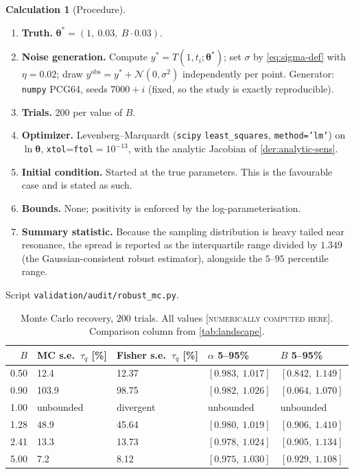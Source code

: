 \documentclass[11pt,a4paper]{article}
\theoremstyle{definition}
\newtheorem{calculationx}{Calculation}[section]
\newcommand{\NUM}{\textcolor{red!55!black}{\footnotesize[\textsc{numerically computed here}]}}
\newcommand{\tq}{\tau_{q}}
\newcommand{\Bnum}{B}
\begin{document}
\begin{calculationx}[Procedure]
\label{calc:mc}
\begin{enumerate}[nosep,label=(\arabic*)]
  \item \textbf{Truth.} $\bm{\theta}^{\ast}=(1,\ 0.03,\ \Bnum\cdot0.03)$.
  \item \textbf{Noise generation.} Compute $y^{\ast}=T(1,t_{i};
        \bm{\theta}^{\ast})$; set $\sigma$ by \eqref{eq:sigma-def} with
        $\eta=0.02$; draw
        $y^{\text{obs}}=y^{\ast}+\mathcal{N}(0,\sigma^{2})$ independently per
        point. Generator: \texttt{numpy} PCG64, seeds $7000+i$ (fixed, so the
        study is exactly reproducible).
  \item \textbf{Trials.} $200$ per value of $\Bnum$.
  \item \textbf{Optimizer.} Levenberg--Marquardt (\texttt{scipy}
        \texttt{least\_squares}, \texttt{method='lm'}) on
        $\ln\bm{\theta}$, \texttt{xtol}=\texttt{ftol}$=10^{-13}$, with the
        analytic Jacobian of \cref{der:analytic-sens}.
  \item \textbf{Initial condition.} Started at the true parameters. This is the
        favourable case and is stated as such.
  \item \textbf{Bounds.} None; positivity is enforced by the log-parameterisation.
  \item \textbf{Summary statistic.} Because the sampling distribution is heavy
        tailed near resonance, the spread is reported as the interquartile
        range divided by $1.349$ (the Gaussian-consistent robust estimator),
        alongside the $5$--$95$ percentile range.
\end{enumerate}
Script \texttt{validation/audit/robust\_mc.py}.
\end{calculationx}

\begin{table}[H]
\centering
\caption{Monte Carlo recovery, $200$ trials. All values \NUM. Comparison
         column from \cref{tab:landscape}.}
\label{tab:mc}
\small
\begin{tabular}{@{}rllll@{}}
\toprule
$\Bnum$ & MC s.e.\ $\tq$ [\%] & Fisher s.e.\ $\tq$ [\%] &
$\alpha$ 5--95\% & $\Bnum$ 5--95\% \\
\midrule
0.50 & 12.4  & 12.37 & $[0.983,\ 1.017]$ & $[0.842,\ 1.149]$ \\
0.90 & 103.9 & 98.75 & $[0.982,\ 1.026]$ & $[0.064,\ 1.070]$ \\
1.00 & unbounded & divergent & unbounded & unbounded \\
1.28 & 48.9  & 45.64 & $[0.980,\ 1.019]$ & $[0.906,\ 1.410]$ \\
2.41 & 13.3  & 13.73 & $[0.978,\ 1.024]$ & $[0.905,\ 1.134]$ \\
5.00 & 7.2   & 8.12  & $[0.975,\ 1.030]$ & $[0.929,\ 1.108]$ \\
\bottomrule
\end{tabular}
\end{table}
\end{document}
